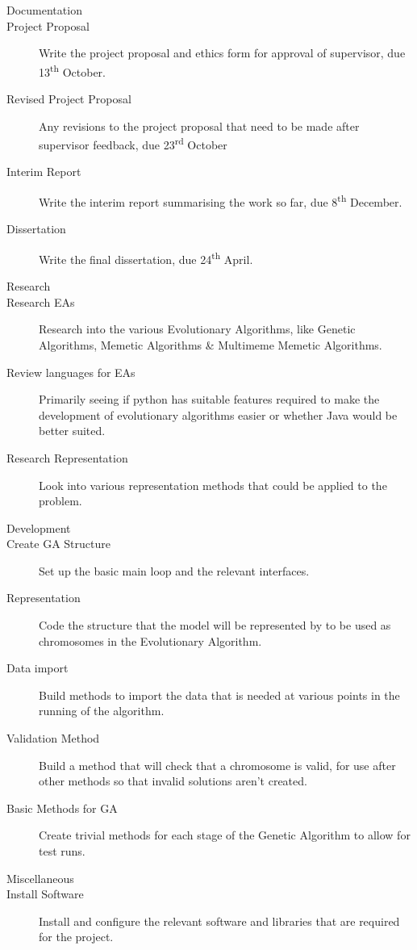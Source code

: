 \documentclass[a4paper]{article}
\begin{document}
\begin{description}
\item [\large{Documentation}]
\item [Project Proposal] Write the project proposal and ethics form for approval of supervisor, due 13\textsuperscript{th} October.
\item [Revised Project Proposal] Any revisions to the project proposal that need to be made after supervisor feedback, due 23\textsuperscript{rd} October
\item [Interim Report] Write the interim report summarising the work so far, due 8\textsuperscript{th} December.
\item [Dissertation] Write the final dissertation, due 24\textsuperscript{th} April.

\item [\large{Research}]
\item [Research EAs] Research into the various Evolutionary Algorithms, like Genetic Algorithms, Memetic Algorithms \& Multimeme Memetic Algorithms.
\item [Review languages for EAs] Primarily seeing if python has suitable features required to make the development of evolutionary algorithms easier or whether Java would be better suited.
\item [Research Representation] Look into various representation methods that could be applied to the problem.

\item [\large{Development}]
\item [Create GA Structure] Set up the basic main loop and the relevant interfaces.
\item [Representation] Code the structure that the model will be represented by to be used as chromosomes in the Evolutionary Algorithm.
\item [Data import] Build methods to import the data that is needed at various points in the running of the algorithm.
\item [Validation Method] Build a method that will check that a chromosome is valid, for use after other methods so that invalid solutions aren't created.
\item [Basic Methods for GA] Create trivial methods for each stage of the Genetic Algorithm to allow for test runs.

\item [\large{Miscellaneous}]
\item [Install Software] Install and configure the relevant software and libraries that are required for the project.


\end{description}
\end{document}

